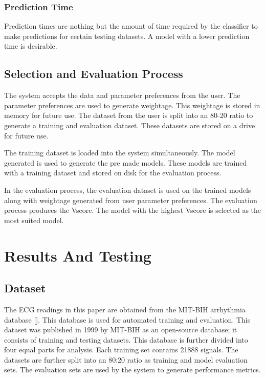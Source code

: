\documentclass[a4paper,fleqn]{cas-dc}
\begin{document}
\subsubsection{Prediction Time}\label{subsubsec:prediction_time}
Prediction times are nothing but the amount of time required by the classifier to make predictions for certain testing datasets. A model with a lower prediction time is desirable.

\subsection{Selection and Evaluation Process} \label{subsec:selection_and_evaluation_process}
The system accepts the data and parameter preferences from the user. The parameter preferences are used to generate weightage. This weightage is stored in memory for future use. The dataset from the user is split into an 80-20 ratio to generate a training and evaluation dataset. These datasets are stored on a drive for future use.

The training dataset is loaded into the system simultaneously. The model generated is used to generate the pre made models. These models are trained with a training dataset and stored on disk for the evaluation process.

In the evaluation process, the evaluation dataset is used on the trained models along with weightage generated from user parameter preferences. The evaluation process produces the Vscore. The model with the highest Vscore is selected as the most suited model.

\FloatBarrier
\section{Results And Testing} \label{sec:results_and_testing}

\subsection{Dataset}\label{subsec:dataset}
The ECG readings in this paper are obtained from the MIT-BIH arrhythmia database []. This database is used for automated training and evaluation. This dataset was published in 1999 by MIT-BIH as an open-source database; it consists of training and testing datasets. This database is further divided into four equal parts for analysis. Each training set contains 21888 signals. The datasets are further split into an 80:20 ratio as training and model evaluation sets. The evaluation sets are used by the system to generate performance metrics.
\end{document}
